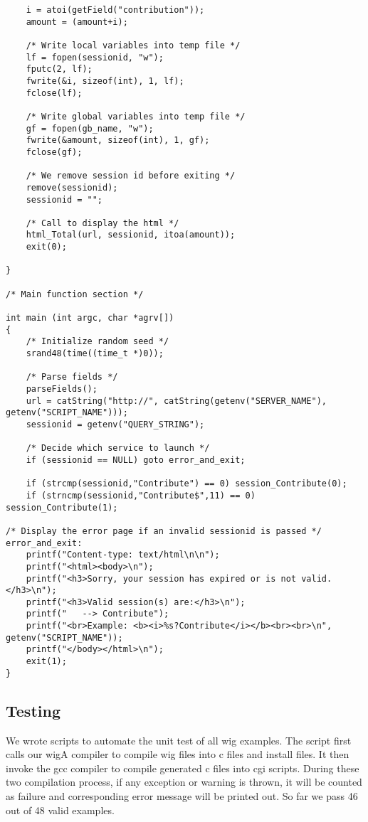 \documentclass{WigReport}
\begin{document}
\begin{verbatim}
	i = atoi(getField("contribution"));
	amount = (amount+i);
	
	/* Write local variables into temp file */
	lf = fopen(sessionid, "w");
	fputc(2, lf);
	fwrite(&i, sizeof(int), 1, lf);
	fclose(lf);

	/* Write global variables into temp file */
	gf = fopen(gb_name, "w");
	fwrite(&amount, sizeof(int), 1, gf);
	fclose(gf);

	/* We remove session id before exiting */
	remove(sessionid);
	sessionid = "";

	/* Call to display the html */
	html_Total(url, sessionid, itoa(amount));
	exit(0);

}

/* Main function section */

int main (int argc, char *agrv[])
{
	/* Initialize random seed */
	srand48(time((time_t *)0));

	/* Parse fields */
	parseFields();
	url = catString("http://", catString(getenv("SERVER_NAME"), getenv("SCRIPT_NAME")));
	sessionid = getenv("QUERY_STRING");

	/* Decide which service to launch */
	if (sessionid == NULL) goto error_and_exit;

	if (strcmp(sessionid,"Contribute") == 0) session_Contribute(0);
	if (strncmp(sessionid,"Contribute$",11) == 0) session_Contribute(1);

/* Display the error page if an invalid sessionid is passed */
error_and_exit:
	printf("Content-type: text/html\n\n");
	printf("<html><body>\n");
	printf("<h3>Sorry, your session has expired or is not valid.</h3>\n");
	printf("<h3>Valid session(s) are:</h3>\n");
	printf("   --> Contribute");
	printf("<br>Example: <b><i>%s?Contribute</i></b><br><br>\n", getenv("SCRIPT_NAME"));
	printf("</body></html>\n");
	exit(1);
}
\end{verbatim}


\subsection{Testing}
We wrote scripts to automate the unit test of all wig examples.
The script first calls our wigA compiler to compile wig files into c files and install files. It then invoke the gcc compiler to compile generated c files into cgi scripts. During these two compilation process, if any exception or warning is thrown, it will be counted as failure and corresponding error message will be printed out. So far we pass 46 out of 48 valid examples.
\end{document}
